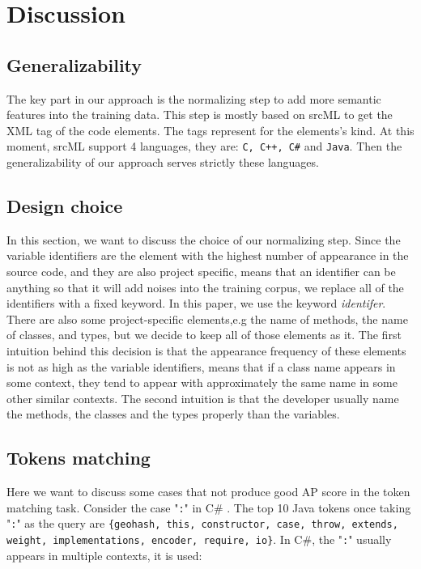 \section{Discussion}
\subsection{Generalizability}

The key part in our approach is the normalizing step to add more semantic features into the training data. This step is mostly based on srcML \cite{collard2011lightweight} to get the XML tag of the code elements. The tags represent for the elements's kind. At this moment, srcML support 4 languages, they are: \texttt{C, C++, C\#} and \texttt{Java}. Then the generalizability of our approach serves strictly these languages.

\subsection{Design choice}
In this section, we want to discuss the choice of our normalizing step.
Since the variable identifiers are the element with the highest number of appearance in the source code, and they are also project specific, means that an identifier can be anything so that it will add noises into the training corpus, we replace all of the identifiers with a fixed keyword. In this paper, we use the keyword \textit{identifer}. There are also some project-specific elements,e.g the name of methods, the name of classes, and types, but we decide to keep all of those elements as it. The first intuition behind this decision is that the appearance frequency of these elements is not as high as the variable identifiers, means that if a class name appears in some context, they tend to appear with approximately the same name in some other similar contexts. The second intuition is that the developer usually name the methods, the classes and the types properly than the variables.

\subsection{Tokens matching}
Here we want to discuss some cases that not produce good AP score in the token matching task. Consider the case "\texttt{:}" in C\# . The top 10 Java tokens once taking "\texttt{:}" as the query are \texttt{\{geohash, this, constructor, case, throw, extends, weight, implementations, encoder, require, io\}}. In C\#, the "\texttt{:}" usually appears in multiple contexts, it is used:

